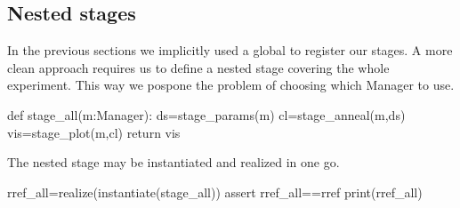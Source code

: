 \mystdout

\subsection{Nested stages}

In the previous sections we implicitly used a global
 to register our stages. A more clean
approach requires us to define a nested stage covering the whole experiment.
This way we pospone the problem of choosing which Manager to use.

\begin{pythontexcode}
def stage_all(m:Manager):
  ds=stage_params(m)
  cl=stage_anneal(m,ds)
  vis=stage_plot(m,cl)
  return vis
\end{pythontexcode}

The nested stage may be instantiated and realized in one go.

\begin{pythontexcode}
rref_all=realize(instantiate(stage_all))
assert rref_all==rref
print(rref_all)
\end{pythontexcode}

\mystdout


